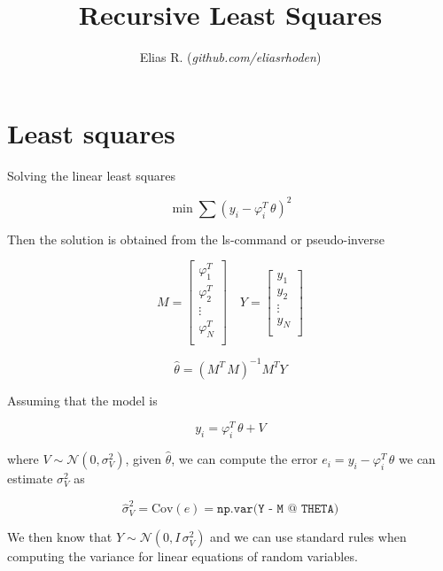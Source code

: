 \documentclass{article}
\title{Recursive Least Squares}
\author{Elias R. (\textit{github.com/eliasrhoden})}
\begin{document}
\maketitle

\section{Least squares}

Solving the linear least squares

\begin{equation}
\min \sum \left(y_i - \varphi_i^T \, \theta  \right)^2
\end{equation}

Then the solution is obtained from the ls-command or pseudo-inverse

\begin{equation}
M = 
\begin{bmatrix}
\varphi_1^T \\
\varphi_2^T \\
\vdots \\
\varphi_N^T \\
\end{bmatrix} \quad 
Y = 
\begin{bmatrix}
y_1 \\
y_2 \\
\vdots \\
y_N \\
\end{bmatrix}
\end{equation}

\begin{equation}
\hat \theta = (M^T \, M)^{-1} M^T Y
\end{equation}

Assuming that the model is 

\begin{equation}
y_i = \varphi_i^T \, \theta + V
\end{equation}

where $V \sim \mathcal{N}(0,\sigma_V^2)$, given $\hat \theta$, we can compute the error $e_i = y_i - \varphi_i^T \, \theta$ we can estimate $\sigma_V^2$ as

\begin{equation}
\hat \sigma_V^2 = \text{Cov}(e) = \texttt{np.var(Y - M @ THETA)}
\end{equation}

We then know that $Y \sim \mathcal{N}(0,I \, \sigma_V^2)$ and we can use standard rules when computing the variance for linear equations of random variables.
\end{document}
